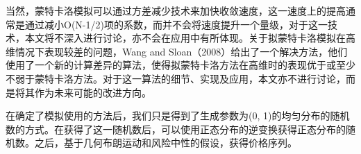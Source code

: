 当然，蒙特卡洛模拟可以通过方差减少技术来加快收敛速度，这一速度上的提高通常是通过减小O(N-1/2)项的系数，而并不会将速度提升一个量级，对于这一技术，本文将不深入进行讨论，亦不会在应用中有所体现。关于拟蒙特卡洛模拟在高维情况下表现较差的问题，Wang and Sloan（2008）给出了一个解决方法，他们使用了一个新的计算差异的算法，使得拟蒙特卡洛方法在高维时的表现优于或至少不弱于蒙特卡洛方法。对于这一算法的细节、实现及应用，本文亦不进行讨论，而是将其作为未来可能的改进方向。

在确定了模拟使用的方法后，我们只是得到了生成参数为(0, 1)的均匀分布的随机数的方式。在获得了这一随机数后，可以使用正态分布的逆变换获得正态分布的随机数。之后，基于几何布朗运动和风险中性的假设，获得价格序列。
